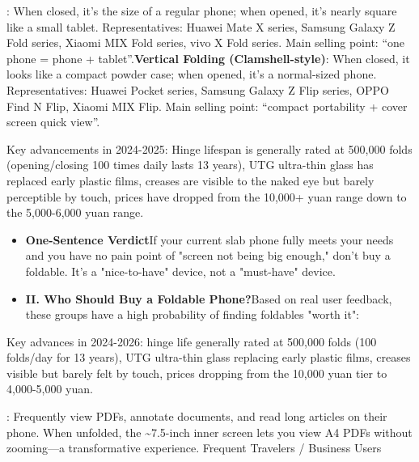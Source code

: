 


: When closed, it's the size of a regular phone; when opened, it's nearly square like a small tablet. Representatives: Huawei Mate X series, Samsung Galaxy Z Fold series, Xiaomi MIX Fold series, vivo X Fold series. Main selling point: “one phone = phone + tablet”.\textbf{Vertical Folding (Clamshell-style)}: When closed, it looks like a compact powder case; when opened, it's a normal-sized phone. Representatives: Huawei Pocket series, Samsung Galaxy Z Flip series, OPPO Find N Flip, Xiaomi MIX Flip. Main selling point: “compact portability + cover screen quick view”.

Key advancements in 2024-2025: Hinge lifespan is generally rated at 500,000 folds (opening/closing 100 times daily lasts 13 years), UTG ultra-thin glass has replaced early plastic films, creases are visible to the naked eye but barely perceptible by touch, prices have dropped from the 10,000+ yuan range down to the 5,000-6,000 yuan range.

\begin{itemize}
  \item \textbf{One-Sentence Verdict}If your current slab phone fully meets your needs and you have no pain point of "screen not being big enough," don't buy a foldable. It's a "nice-to-have" device, not a "must-have" device.
  \item \textbf{II. Who Should Buy a Foldable Phone?}Based on real user feedback, these groups have a high probability of finding foldables "worth it":
\end{itemize}

Key advances in 2024-2026: hinge life generally rated at 500,000 folds (100 folds/day for 13 years), UTG ultra-thin glass replacing early plastic films, creases visible but barely felt by touch, prices dropping from the 10,000 yuan tier to 4,000-5,000 yuan.

\begin{tcbinfo}{: Frequently view PDFs, annotate documents, and read long articles on their phone. When unfolded, the \textasciitilde{}7.5-inch inner screen lets you view A4 PDFs without zooming—a transformative experience.}
Frequent Travelers / Business Users

\end{tcbinfo}

